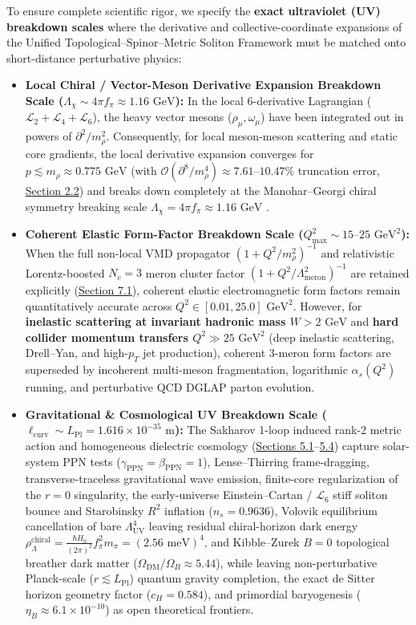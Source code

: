 \documentclass[10pt,aps,prd,twocolumn,superscriptaddress,nofootinbib,floatfix,longbibliography,showkeys]{revtex4-2}
\begin{document}
To ensure complete scientific rigor, we specify the \textbf{exact ultraviolet (UV) breakdown scales} where the derivative and collective-coordinate expansions of the Unified Topological--Spinor--Metric Soliton Framework must be matched onto short-distance perturbative physics:
\begin{itemize}
  \item \textbf{Local Chiral / Vector-Meson Derivative Expansion Breakdown Scale ($\Lambda_\chi \sim 4\pi f_\pi \approx 1.16\text{ GeV}$):}
  In the local 6-derivative Lagrangian ($\mathcal{L}_2 + \mathcal{L}_4 + \mathcal{L}_6$), the heavy vector mesons ($\rho_\mu, \omega_\mu$) have been integrated out in powers of $\partial^2 / m_\rho^2$. Consequently, for local meson-meson scattering and static core gradients, the local derivative expansion converges for $p \lesssim m_\rho \approx 0.775\text{ GeV}$ (with $\mathcal{O}(\partial^8/m_\rho^4) \approx 7.61\text{--}10.47\%$ truncation error, \hyperref[sec:2.2]{Section 2.2}) and breaks down completely at the Manohar--Georgi chiral symmetry breaking scale $\Lambda_\chi = 4\pi f_\pi \approx 1.16\text{ GeV}$ \cite{ref54}.
  \item \textbf{Coherent Elastic Form-Factor Breakdown Scale ($Q^2_{\max} \sim 15\text{--}25\text{ GeV}^2$):}
  When the full non-local VMD propagator $(1 + Q^2/m_\rho^2)^{-1}$ and relativistic Lorentz-boosted $N_c = 3$ meron cluster factor $(1 + Q^2/\Lambda_{\text{meron}}^2)^{-1}$ are retained explicitly (\hyperref[sec:7.1]{Section 7.1}), coherent elastic electromagnetic form factors remain quantitatively accurate across $Q^2 \in [0.01, 25.0]\text{ GeV}^2$. However, for \textbf{inelastic scattering at invariant hadronic mass $W > 2\text{ GeV}$} and \textbf{hard collider momentum transfers $Q^2 \gg 25\text{ GeV}^2$} (deep inelastic scattering, Drell--Yan, and high-$p_T$ jet production), coherent 3-meron form factors are superseded by incoherent multi-meson fragmentation, logarithmic $\alpha_s(Q^2)$ running, and perturbative QCD DGLAP parton evolution.
  \item \textbf{Gravitational \& Cosmological UV Breakdown Scale ($\ell_{\text{curv}} \sim L_{\text{Pl}} = 1.616 \times 10^{-35}\text{ m}$):}
  The Sakharov 1-loop induced rank-2 metric action and homogeneous dielectric cosmology (\hyperref[sec:5.1]{Sections 5.1}--\hyperref[sec:5.4]{5.4}) capture solar-system PPN tests ($\gamma_{\text{PPN}}=\beta_{\text{PPN}}=1$), Lense--Thirring frame-dragging, transverse-traceless gravitational wave emission, finite-core regularization of the $r=0$ singularity, the early-universe Einstein--Cartan / $\mathcal{L}_6$ stiff soliton bounce and Starobinsky $R^2$ inflation ($n_s = 0.9636$), Volovik equilibrium cancellation of bare $\Lambda_{\text{UV}}^4$ leaving residual chiral-horizon dark energy $\rho_\Lambda^{\text{chiral}} = \frac{\hbar H_0}{(2\pi)^2}f_\pi^2 m_\pi = (2.56\text{ meV})^4$, and Kibble--Zurek $B=0$ topological breather dark matter ($\Omega_{\text{DM}}/\Omega_B \approx 5.44$), while leaving non-perturbative Planck-scale ($r \lesssim L_{\text{Pl}}$) quantum gravity completion, the exact de Sitter horizon geometry factor ($c_H = 0.584$), and primordial baryogenesis ($\eta_B \approx 6.1 \times 10^{-10}$) as open theoretical frontiers.


\end{itemize}
\end{document}
